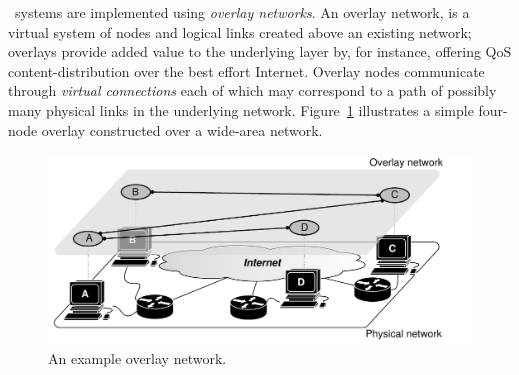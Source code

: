 \p\ systems are implemented using \emph{overlay networks}. 
An overlay network, is a virtual system of nodes and logical links
created above an existing network; overlays provide
added value to the underlying layer by, for instance, offering QoS
content-distribution over the best effort Internet. 
Overlay nodes communicate through \emph{virtual connections} each 
of which may correspond to a path of possibly many physical links 
in the underlying network.
Figure~\ref{figure:overlay} illustrates a simple four-node overlay constructed
over a wide-area network.
\begin{figure}[ht]
\centering
  \includegraphics[scale=0.6]{img/pdf/under-over-lay.pdf}
\caption{An example overlay network.}
\label{figure:overlay}
\end{figure}

